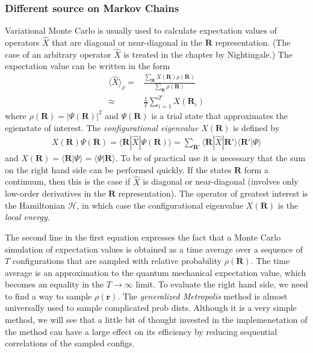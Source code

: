 \documentclass[twoside,english]{uiofysmaster}
\begin{document}
\subsubsection{Different source on Markov Chains}
Variational Monte Carlo is usually used to calculate expectation values of operators $\hat{X}$ that are diagonal or near-diagonal in the $\bm{R}$ representation. (The case of an arbitrary operator $\hat{X}$ is treated in the chapter by Nightingale.) The expectation value can be written in the form
\begin{align}
	\langle \hat{X} \rangle_\rho =& \frac{\sum_{\bm{R}} X(\bm{R}) \rho(\bm{R})}{\sum_{\bm{R}} \rho (\bm{R})} \\
	\approx & \frac{1}{T} \sum_{i=1}^T X(\bm{R}_i)
\end{align}
where $\rho(\bm{R}) = |\Psi (\bm{R})|^2$ and $\Psi(\bm{R})$ is a trial state that approximates the egienstate of interest.
The \textit{configurational eigenvalue} $X(\bm{R})$ is defined by
\begin{align}
	X(\bm{R}) \Psi (\bm{R}) = \langle \bm{R} | \hat{X} | \Psi (\bm{R}) \rangle = \sum_{\bm{R}'} \langle \bm{R} | \hat{X} | \bm{R}' \rangle \langle \bm{R}' | \Psi \rangle
\end{align}
and $X(\bm{R}) = \langle \bm{R}|\Psi \rangle = \langle \Psi | \bm{R} \rangle$. 
To be of practical use it is necessary that the sum on the right hand side can be performed quickly. If the states $\bm{R}$ form a continuum, then this is the case if $\hat{X}$ is diagonal or near-diagonal (involves only low-order derivatives in the $\bm{R}$ representation).
The operator of greatest interest is the Hamiltonian $\mathcal{H}$, in which case the configurational eigenvalue $X(\bm{R})$ is the \textit{local energy}.

The second line in the first equation expresses the fact that a Monte Carlo simulation of expectation values is obtained as a time average over a sequence of $T$ configurations that are sampled with relative probability $\rho(\bm{R})$. The time average is an approximation to the quantum mechanical expectation value, which becomes an equality in the $T\rightarrow \infty$ limit. To evaluate the right hand side, we need to find a way to sample  $\rho(\bm{r})$. The \textit{generalized Metropolis} method is almost universally used to sample complicated prob dists. Although it is a very simple method, we will see that a little bit of thought invested in the implemenetation of the method can have a large effect on its efficiency by reducing sequential correlations of the sampled configs. 
\end{document}
